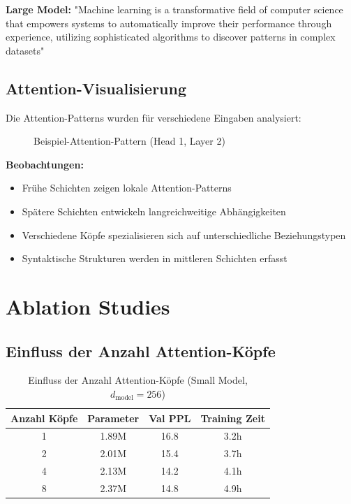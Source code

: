\textbf{Large Model:} "Machine learning is a transformative field of computer science that empowers systems to automatically improve their performance through experience, utilizing sophisticated algorithms to discover patterns in complex datasets"

\subsection{Attention-Visualisierung}

Die Attention-Patterns wurden für verschiedene Eingaben analysiert:

\begin{figure}[h]
\centering
{}
\caption{Beispiel-Attention-Pattern (Head 1, Layer 2)}
\label{fig:attention_pattern}
\end{figure}

\textbf{Beobachtungen:}
\begin{itemize}
    \item Frühe Schichten zeigen lokale Attention-Patterns
    \item Spätere Schichten entwickeln langreichweitige Abhängigkeiten
    \item Verschiedene Köpfe spezialisieren sich auf unterschiedliche Beziehungstypen
    \item Syntaktische Strukturen werden in mittleren Schichten erfasst
\end{itemize}

\section{Ablation Studies}

\subsection{Einfluss der Anzahl Attention-Köpfe}

\begin{table}[h]
\centering
\begin{tabular}{|c|c|c|c|}
\hline
\textbf{Anzahl Köpfe} & \textbf{Parameter} & \textbf{Val PPL} & \textbf{Training Zeit} \\
\hline
1 & 1.89M & 16.8 & 3.2h \\
2 & 2.01M & 15.4 & 3.7h \\
4 & 2.13M & 14.2 & 4.1h \\
8 & 2.37M & 14.8 & 4.9h \\
\hline
\end{tabular}
\caption{Einfluss der Anzahl Attention-Köpfe (Small Model, $d_{\text{model}}=256$)}
\label{tab:attention_heads_ablation}
\end{table}

